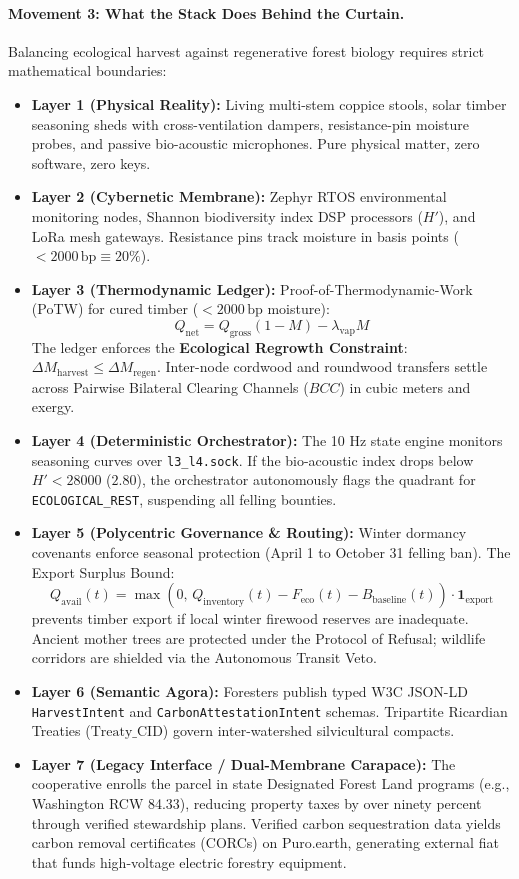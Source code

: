 \paragraph{Movement 3: What the Stack Does Behind the Curtain.}
Balancing ecological harvest against regenerative forest biology requires strict mathematical boundaries:
\begin{itemize}
    \item \textbf{Layer 1 (Physical Reality):} Living multi-stem coppice stools, solar timber seasoning sheds with cross-ventilation dampers, resistance-pin moisture probes, and passive bio-acoustic microphones. Pure physical matter, zero software, zero keys.
    \item \textbf{Layer 2 (Cybernetic Membrane):} Zephyr RTOS environmental monitoring nodes, Shannon biodiversity index DSP processors ($H'$), and LoRa mesh gateways. Resistance pins track moisture in basis points ($< 2000\,\mathrm{bp} \equiv 20\%$).
    \item \textbf{Layer 3 (Thermodynamic Ledger):} Proof-of-Thermodynamic-Work (PoTW) for cured timber ($< 2000\,\mathrm{bp}$ moisture):
    \[
    Q_{\mathrm{net}} = Q_{\mathrm{gross}}(1 - M) - \lambda_{\mathrm{vap}} M
    \]
    The ledger enforces the \textbf{Ecological Regrowth Constraint}: $\Delta M_{\mathrm{harvest}} \le \Delta M_{\mathrm{regen}}$. Inter-node cordwood and roundwood transfers settle across Pairwise Bilateral Clearing Channels ($BCC$) in cubic meters and exergy.
    \item \textbf{Layer 4 (Deterministic Orchestrator):} The 10 Hz state engine monitors seasoning curves over \texttt{l3\_l4.sock}. If the bio-acoustic index drops below $H' < 28000$ ($2.80$), the orchestrator autonomously flags the quadrant for \texttt{ECOLOGICAL\_REST}, suspending all felling bounties.
    \item \textbf{Layer 5 (Polycentric Governance \& Routing):} Winter dormancy covenants enforce seasonal protection (April 1 to October 31 felling ban). The Export Surplus Bound:
    \[
    Q_{\mathrm{avail}}(t) = \max\left(0, \, Q_{\mathrm{inventory}}(t) - F_{\mathrm{eco}}(t) - B_{\mathrm{baseline}}(t)\right) \cdot \mathbf{1}_{\mathrm{export}}
    \]
    prevents timber export if local winter firewood reserves are inadequate. Ancient mother trees are protected under the Protocol of Refusal; wildlife corridors are shielded via the Autonomous Transit Veto.
    \item \textbf{Layer 6 (Semantic Agora):} Foresters publish typed W3C JSON-LD \texttt{HarvestIntent} and \texttt{CarbonAttestationIntent} schemas. Tripartite Ricardian Treaties ($\mathrm{Treaty\_CID}$) govern inter-watershed silvicultural compacts.
    \item \textbf{Layer 7 (Legacy Interface / Dual-Membrane Carapace):} The cooperative enrolls the parcel in state Designated Forest Land programs (e.g., Washington RCW 84.33), reducing property taxes by over ninety percent through verified stewardship plans. Verified carbon sequestration data yields carbon removal certificates (CORCs) on Puro.earth, generating external fiat that funds high-voltage electric forestry equipment.
\end{itemize}

